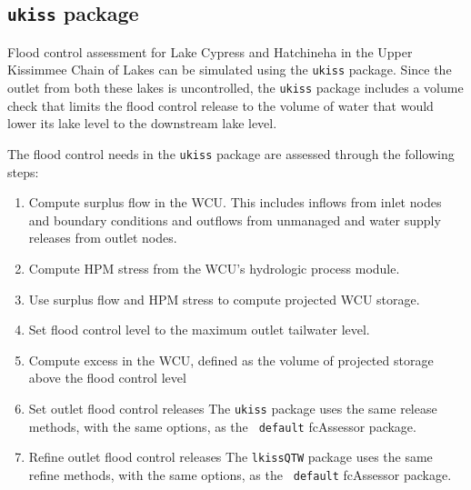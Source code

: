 \subsection{{\tt ukiss} package }

Flood control assessment for Lake Cypress and Hatchineha in the Upper
Kissimmee Chain of Lakes can be simulated using the {\tt ukiss}
package.  Since the outlet from both these lakes is uncontrolled, the
{\tt ukiss} package includes a volume check that limits the flood
control release to the volume of water that would lower its lake level
to the downstream lake level.

The flood control needs in the {\tt ukiss} package are assessed
through the following steps:
\begin{enumerate}
 \item Compute surplus flow in the WCU.  This includes inflows from
   inlet nodes and boundary conditions and outflows from unmanaged and
   water supply releases from outlet nodes.

 \item Compute HPM stress from the WCU's hydrologic process module.

 \item Use surplus flow and HPM stress to compute projected WCU
   storage.

 \item Set flood control level to the maximum outlet tailwater level.

 \item Compute excess in the WCU, defined as the volume of projected
   storage above the flood control level

 \item Set outlet flood control releases The {\tt ukiss} package
   uses the same release methods, with the same options, as the {\tt
   default} fcAssessor package.

 \item Refine outlet flood control releases The {\tt lkissQTW} package
   uses the same refine methods, with the same options, as the {\tt
   default} fcAssessor package.  

\end{enumerate}


